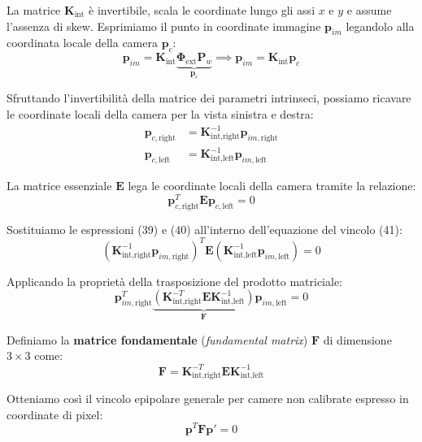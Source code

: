 ﻿\documentclass[11pt, a4paper]{article}
\begin{document}
La matrice $\bm{K}_{\text{int}}$ è invertibile, scala le coordinate lungo gli assi $x$ e $y$ e assume l'assenza di skew. Esprimiamo il punto in coordinate immagine $\bm{p}_{im}$ legandolo alla coordinata locale della camera $\bm{p}_c$:
\begin{equation}
\bm{p}_{im} = \bm{K}_{\text{int}} \underbrace{\bm{\Phi}_{\text{ext}} \bm{P}_w}_{\bm{p}_c} \implies \bm{p}_{im} = \bm{K}_{\text{int}} \bm{p}_c
\end{equation}

Sfruttando l'invertibilità della matrice dei parametri intrinseci, possiamo ricavare le coordinate locali della camera per la vista sinistra e destra:
\begin{align}
\bm{p}_{c,\text{right}} &= \bm{K}_{\text{int},\text{right}}^{-1} \bm{p}_{im,\text{right}} \\
\bm{p}_{c,\text{left}} &= \bm{K}_{\text{int},\text{left}}^{-1} \bm{p}_{im,\text{left}}
\end{align}

La matrice essenziale $\bm{E}$ lega le coordinate locali della camera tramite la relazione:
\begin{equation}
\bm{p}_{c,\text{right}}^T \bm{E} \bm{p}_{c,\text{left}} = 0
\end{equation}

Sostituiamo le espressioni (39) e (40) all'interno dell'equazione del vincolo (41):
\[
\left( \bm{K}_{\text{int},\text{right}}^{-1} \bm{p}_{im,\text{right}} \right)^T \bm{E} \left( \bm{K}_{\text{int},\text{left}}^{-1} \bm{p}_{im,\text{left}} \right) = 0
\]

Applicando la proprietà della trasposizione del prodotto matriciale:
\begin{equation}
\bm{p}_{im,\text{right}}^T \underbrace{\left( \bm{K}_{\text{int},\text{right}}^{-T} \bm{E} \bm{K}_{\text{int},\text{left}}^{-1} \right)}_{\bm{F}} \bm{p}_{im,\text{left}} = 0
\end{equation}

Definiamo la \textbf{matrice fondamentale} (\emph{fundamental matrix}) $\bm{F}$ di dimensione $3 \times 3$ come:
\begin{equation}
\boxed{\bm{F} = \bm{K}_{\text{int},\text{right}}^{-T} \bm{E} \bm{K}_{\text{int},\text{left}}^{-1}}
\end{equation}

Otteniamo così il vincolo epipolare generale per camere non calibrate espresso in coordinate di pixel:
\begin{equation}
\boxed{\bm{p}^T \bm{F} \bm{p}' = 0}
\end{equation}
\end{document}
